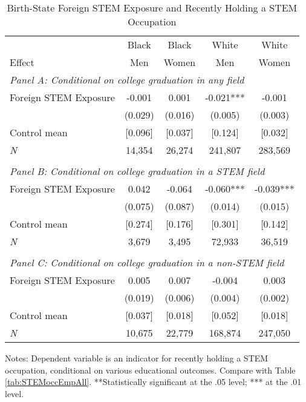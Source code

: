 \begin{table}[ht]
\caption{Birth-State Foreign STEM Exposure and Recently Holding a STEM Occupation}
\label{tab:STEMoccAll}
\centering
\begin{threeparttable}
\begin{tabular}{lcccc}
\toprule 
       & Black           & Black        & White        & White       \\
Effect & Men             & Women        & Men          & Women       \\
\midrule 
\multicolumn{5}{l}{\emph{Panel A: Conditional on college graduation in any field}}\\ 
Foreign STEM Exposure & -0.001  & 0.001  & -0.021*** & -0.001  \\ 
 &  (0.029) & (0.016) & (0.005) & (0.003) \\ 
Control mean &  [0.096] & [0.037] & [0.124] & [0.032] \\ 
\emph{N} &     14,354 &    26,274 &   241,807 &   283,569 \\ 
&&&&\\
\multicolumn{5}{l}{\emph{Panel B: Conditional on college graduation in a STEM field}}\\ 
Foreign STEM Exposure & 0.042  & -0.064  & -0.060*** & -0.039*** \\ 
 &  (0.075) & (0.087) & (0.014) & (0.015) \\ 
Control mean &  [0.274] & [0.176] & [0.301] & [0.142] \\ 
\emph{N} &      3,679 &     3,495 &    72,933 &    36,519 \\ 
&&&&\\
\multicolumn{5}{l}{\emph{Panel C: Conditional on college graduation in a non-STEM field}}\\ 
Foreign STEM Exposure & 0.005  & 0.007  & -0.004  & 0.003  \\ 
 &  (0.019) & (0.006) & (0.004) & (0.002) \\ 
Control mean &  [0.037] & [0.018] & [0.052] & [0.018] \\ 
\emph{N} &     10,675 &    22,779 &   168,874 &   247,050 \\ 
\bottomrule 
\end{tabular} 
\footnotesize Notes: Dependent variable is an indicator for recently holding a STEM occupation, conditional on various educational outcomes.  Compare with Table \ref{tab:STEMoccEmpAll}. **Statistically significant at the .05 level; *** at the .01 level.
\end{threeparttable} 
\end{table} 
